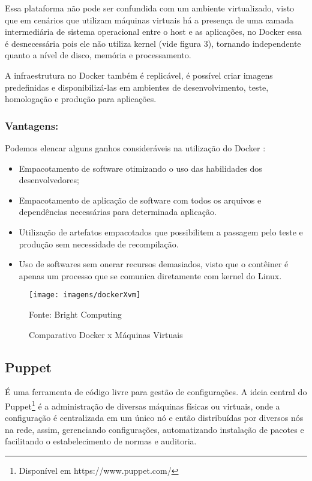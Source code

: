 Essa plataforma não pode ser confundida com um ambiente virtualizado, visto que em cenários que utilizam máquinas virtuais há a presença de uma camada intermediária de sistema operacional entre o host e as aplicações, no Docker essa é desnecessária pois ele não utiliza kernel (vide figura 3), tornando independente quanto a nível de disco, memória e processamento.\cite{mouat}

A infraestrutura no Docker também é replicável, é possível criar imagens predefinidas e disponibilizá-las em ambientes de desenvolvimento, teste, homologação e produção para aplicações.\cite{mattiaskane}

\subsubsection{Vantagens:}
Podemos elencar alguns ganhos consideráveis na utilização do Docker \cite{scampini} :
\begin{itemize}
\item Empacotamento de software otimizando o uso das habilidades dos desenvolvedores;
\item Empacotamento de aplicação de software com todos os arquivos e dependências necessárias para determinada aplicação.
\item Utilização de artefatos empacotados que possibilitem a passagem pelo teste e produção sem necessidade de recompilação.
\item Uso de softwares sem onerar recursos demasiados, visto que o contêiner é apenas um processo que se comunica diretamente com kernel do Linux.
\end{itemize}

\begin{figure} [htb]
	\centering
	
	\texttt{[image: imagens/dockerXvm]}
	\caption{Comparativo Docker x Máquinas Virtuais}
	Fonte: Bright Computing\footnotemark
	\label{fig:dockerXvm}
	
\end{figure}

	


\subsection{Puppet}
É uma ferramenta de código livre para gestão de configurações. A ideia central do Puppet\footnote{Disponível em https://www.puppet.com/} é a administração de diversas máquinas físicas ou virtuais, onde a configuração é centralizada em um único nó e então distribuídas por diversos nós na rede, assim, gerenciando configurações, automatizando instalação de pacotes e facilitando o estabelecimento de normas e auditoria.\cite{walberg2008automate}

